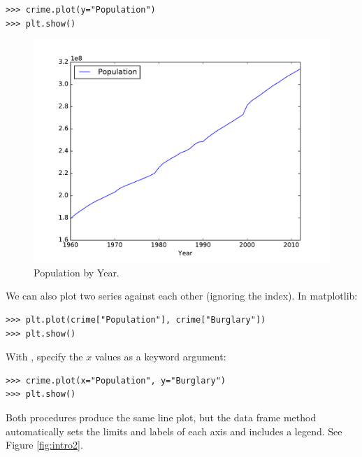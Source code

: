 \begin{lstlisting}
>>> crime.plot(y="Population")
>>> plt.show()
\end{lstlisting}


\begin{figure}[H] %
    \centering
    \includegraphics[scale=.5]{population.pdf}
    \caption{Population by Year.}
    \label{fig:intro}
\end{figure}

We can also plot two series against each other (ignoring the index).
In matplotlib:

\begin{lstlisting}
>>> plt.plot(crime["Population"], crime["Burglary"])
>>> plt.show()
\end{lstlisting}

With , specify the $x$ values as a keyword argument:

\begin{lstlisting}
>>> crime.plot(x="Population", y="Burglary")
>>> plt.show()
\end{lstlisting}

Both procedures produce the same line plot, but the data frame method automatically sets the limits and labels of each axis and includes a legend.
See Figure \ref{fig:intro2}.

